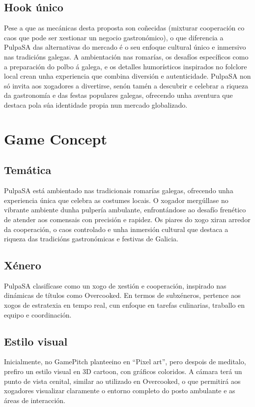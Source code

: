 \documentclass{report}  %
\begin{document}
\subsection{Hook único}
Pese a que as mecánicas desta proposta son coñecidas (mixturar cooperación 
co caos que pode ser xestionar un negocio gastronómico), o que diferencia a 
PulpaSA das alternativas do mercado é o seu enfoque cultural único e 
inmersivo nas tradicións galegas. A ambientación nas romarías, os desafíos 
específicos como a preparación do polbo á galega, e os detalles humorísticos 
inspirados no folclore local crean unha experiencia que combina diversión e 
autenticidade. PulpaSA non só invita aos xogadores a divertirse, senón tamén a 
descubrir e celebrar a riqueza da gastronomía e das festas populares galegas, 
ofrecendo unha aventura que destaca pola súa identidade propia nun mercado 
globalizado.

\section{Game Concept}

\subsection{Temática}
PulpaSA está ambientado nas tradicionais romarías galegas, ofrecendo unha 
experiencia única que celebra as costumes locais. O xogador mergúllase no 
vibrante ambiente dunha pulpería ambulante, enfrontándose ao desafío 
frenético de atender aos comensais con precisión e rapidez. Os piares do xogo 
xiran arredor da cooperación, o caos controlado e unha inmersión cultural que 
destaca a riqueza das tradicións gastronómicas e festivas de Galicia. 

\subsection{Xénero}
PulpaSA clasifícase como un xogo de xestión e cooperación, inspirado nas 
dinámicas de títulos como Overcooked. En termos de subxéneros, pertence 
aos xogos de estratexia en tempo real, cun enfoque en tarefas culinarias, 
traballo en equipo e coordinación. 

\subsection{Estilo visual}
Inicialmente, no GamePitch planteeino en “Pixel art”, pero despois de meditalo, 
prefiro un estilo visual en 3D cartoon, con gráficos coloridos. A cámara terá un 
punto de vista cenital, similar ao utilizado en Overcooked, o que permitirá aos 
xogadores visualizar claramente o entorno completo do posto ambulante e as 
áreas de interacción. 
\end{document}
